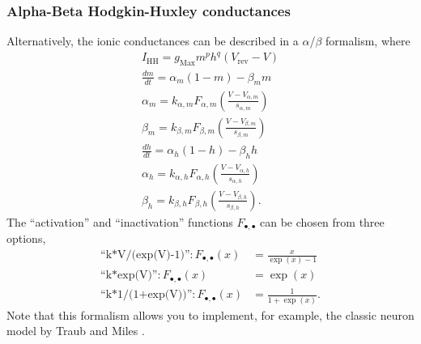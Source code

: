 \documentclass{article}
\begin{document}
\subsubsection{Alpha-Beta Hodgkin-Huxley conductances}

\noindent
Alternatively, the ionic conductances can be described in a
$\alpha$/$\beta$ formalism, where
\begin{align}
I_{\text{HH}}= g_{\text{Max}} m^p h^q (V_{\text{rev}}-V) \\
\frac{dm}{dt}= \alpha_m (1-m) - \beta_m m \\
\alpha_m= k_{\alpha,m} F_{\alpha,m}\left(\frac{V-V_{\alpha,m}}{s_{\alpha,m}}
\right) \\
\beta_m= k_{\beta,m} F_{\beta,m}\left(\frac{V-V_{\beta,m}}{s_{\beta,m}}
\right) \\
\frac{dh}{dt}= \alpha_h (1 - h) - \beta_h h \\
\alpha_h= k_{\alpha,h} F_{\alpha,h}\left(\frac{V-V_{\alpha,h}}{s_{\alpha,h}}
\right) \\
\beta_h= k_{\beta,h} F_{\beta,h}\left(\frac{V-V_{\beta,h}}{s_{\beta,h}}
\right).
\end{align}
The ``activation'' and ``inactivation'' functions $F_{\bullet , \bullet}$ can
be chosen from three options,
\begin{align}
\text{``k*V/(exp(V)-1)''} : F_{\bullet , \bullet}(x) &= \frac{x}{\exp(x)-1} \\
\text{``k*exp(V)''} : F_{\bullet , \bullet}(x) &= \exp(x) \\
\text{``k*1/(1+exp(V))''} : F_{\bullet , \bullet}(x) &= \frac{1}{1+\exp(x)}.
\end{align}
Note that this formalism allows you to implement, for example, the classic
neuron model by Traub and Miles \cite{Traub1991}. \\
\end{document}
